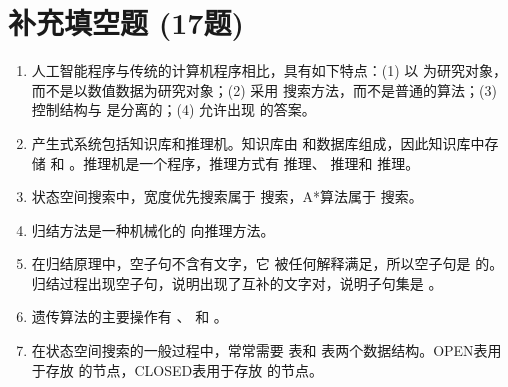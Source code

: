 
\section{补充填空题 (17题)}

\begin{enumerate}[leftmargin=2em,itemsep=1pt]
\item 人工智能程序与传统的计算机程序相比，具有如下特点：(1) 以 \underline{\hspace{4em}} 为研究对象，而不是以数值数据为研究对象；(2) 采用 \underline{\hspace{4em}} 搜索方法，而不是普通的算法；(3) 控制结构与 \underline{\hspace{4em}} 是分离的；(4) 允许出现 \underline{\hspace{4em}} 的答案。
\item 产生式系统包括知识库和推理机。知识库由 \underline{\hspace{4em}} 和数据库组成，因此知识库中存储 \underline{\hspace{4em}} 和 \underline{\hspace{4em}}。推理机是一个程序，推理方式有 \underline{\hspace{4em}} 推理、 \underline{\hspace{4em}} 推理和 \underline{\hspace{4em}} 推理。
\item 状态空间搜索中，宽度优先搜索属于 \underline{\hspace{4em}} 搜索，A*算法属于 \underline{\hspace{4em}} 搜索。
\item 归结方法是一种机械化的 \underline{\hspace{4em}} 向推理方法。
\item 在归结原理中，空子句不含有文字，它 \underline{\hspace{4em}} 被任何解释满足，所以空子句是 \underline{\hspace{4em}} 的。归结过程出现空子句，说明出现了互补的文字对，说明子句集是 \underline{\hspace{4em}}。
\item 遗传算法的主要操作有 \underline{\hspace{4em}}、\underline{\hspace{4em}} 和 \underline{\hspace{4em}}。
\item 在状态空间搜索的一般过程中，常常需要 \underline{\hspace{4em}} 表和 \underline{\hspace{4em}} 表两个数据结构。OPEN表用于存放 \underline{\hspace{4em}} 的节点，CLOSED表用于存放 \underline{\hspace{4em}} 的节点。

\end{enumerate}
